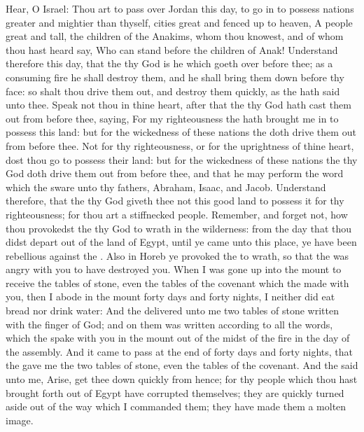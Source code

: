 \begin{biblechapter} %
 Hear, O Israel: Thou art to pass over Jordan this day, to go in to possess nations greater and mightier than thyself, cities great and fenced up to heaven,
\verse A people great and tall, the children of the Anakims, whom thou knowest, and of whom thou hast heard say, Who can stand before the children of Anak!
\verse Understand therefore this day, that the \LORD thy God is he which goeth over before thee; as a consuming fire he shall destroy them, and he shall bring them down before thy face: so shalt thou drive them out, and destroy them quickly, as the \LORD hath said unto thee.
\verse Speak not thou in thine heart, after that the \LORD thy God hath cast them out from before thee, saying, For my righteousness the \LORD hath brought me in to possess this land: but for the wickedness of these nations the \LORD doth drive them out from before thee.
\verse Not for thy righteousness, or for the uprightness of thine heart, dost thou go to possess their land: but for the wickedness of these nations the \LORD thy God doth drive them out from before thee, and that he may perform the word which the \LORD sware unto thy fathers, Abraham, Isaac, and Jacob.
\verse Understand therefore, that the \LORD thy God giveth thee not this good land to possess it for thy righteousness; for thou art a stiffnecked people.
 Remember, and forget not, how thou provokedst the \LORD thy God to wrath in the wilderness: from the day that thou didst depart out of the land of Egypt, until ye came unto this place, ye have been rebellious against the \LORD.
\verse Also in Horeb ye provoked the \LORD to wrath, so that the \LORD was angry with you to have destroyed you.
\verse When I was gone up into the mount to receive the tables of stone, even the tables of the covenant which the \LORD made with you, then I abode in the mount forty days and forty nights, I neither did eat bread nor drink water:
\verse And the \LORD delivered unto me two tables of stone written with the finger of God; and on them was written according to all the words, which the \LORD spake with you in the mount out of the midst of the fire in the day of the assembly.
\verse And it came to pass at the end of forty days and forty nights, that the \LORD gave me the two tables of stone, even the tables of the covenant.
\verse And the \LORD said unto me, Arise, get thee down quickly from hence; for thy people which thou hast brought forth out of Egypt have corrupted themselves; they are quickly turned aside out of the way which I commanded them; they have made them a molten image.

\end{biblechapter}
